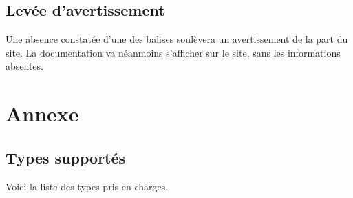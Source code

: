 \section{Levée d'avertissement}

Une absence constatée d'une des balises soulèvera un avertissement de la part du site. La documentation va néanmoins s'afficher sur le site, sans les informations absentes. \newline
{}

    

\chapter{Annexe}

\section{Types supportés}

Voici la liste des types pris en charges.

